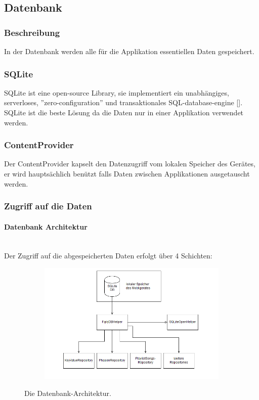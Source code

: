 \documentclass[FIPLY_base.tex]{subfiles}
\begin{document}
\subsection{Datenbank}
\subsubsection{Beschreibung}
In der Datenbank werden alle für die Applikation essentiellen Daten gespeichert.

\subsubsection{SQLite}
SQLite ist eine open-source Library, sie implementiert ein unabhängiges, serverloses, ''zero-configuration'' und transaktionales SQL-database-engine [\cite{dbSQLite}]. SQLite ist die beste Lösung da die Daten nur in einer Applikation verwendet werden.

\subsubsection{ContentProvider}
Der ContentProvider kapselt den Datenzugriff vom lokalen Speicher des Gerätes, er wird hauptsächlich benützt falls Daten zwischen Applikationen ausgetauscht werden. 

\subsubsection{Zugriff auf die Daten}


\paragraph{Datenbank Architektur}\ \\
Der Zugriff auf die abgespeicherten Daten erfolgt über 4 Schichten:

\begin{figure}[H]
	\begin{subfigure}[b]{0.3\textwidth}
	\includegraphics[scale=0.4]{img/Database_architecture}
	\end{subfigure}
	\hfil
	\caption{Die Datenbank-Architektur.}
\end{figure}
\end{document}
